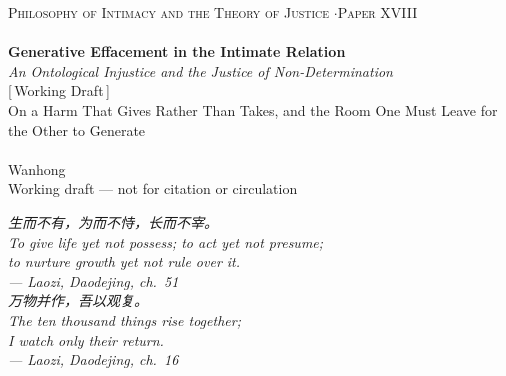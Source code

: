 \documentclass[11pt,a4paper]{article}
\begin{document}
\thispagestyle{empty}
\begin{center}
\vspace*{2cm}
{\footnotesize\color{rosedeep}\scshape Philosophy of Intimacy and the Theory of Justice \quad$\cdot$\quad Paper XVIII}\\[0.3cm]
\coverrule\\[1.2cm]
{\LARGE\bfseries\color{warnred} Generative Effacement in the Intimate Relation}\\[0.8cm]
{\large\itshape\color{warnred} An Ontological Injustice and the Justice of Non-Determination}\\[0.8cm]
{\small\color{gold} [\,Working Draft\,]}\\[0.8cm]
{\normalsize\color{inksoft} On a Harm That Gives Rather Than Takes, and the Room One Must Leave for the Other to Generate}\\[2cm]
\coverrule[0.25]\\[0.6cm]
{\normalsize\color{inksoft} Wanhong}\\
\vfill
{\footnotesize\color{gold} Working draft --- not for citation or circulation}
\coverfootnote
\end{center}
\newpage

\thispagestyle{empty}
\vspace*{2.4cm}
\begin{center}
\begin{minipage}{0.74\linewidth}
\centering\itshape\color{rose}
{\cjk 生而不有，为而不恃，长而不宰。}\\[0.3em]
To give life yet not possess; to act yet not presume;\\[0.15em]
to nurture growth yet not rule over it.\\[0.6em]
{\upshape\footnotesize\color{gold} --- Laozi, \emph{Daodejing}, ch.~51}\\[1.2em]
\itshape
{\cjk 万物并作，吾以观复。}\\[0.3em]
The ten thousand things rise together;\\[0.15em]
I watch only their return.\\[0.6em]
{\upshape\footnotesize\color{gold} --- Laozi, \emph{Daodejing}, ch.~16}
\end{minipage}
\end{center}
\newpage
\end{document}
